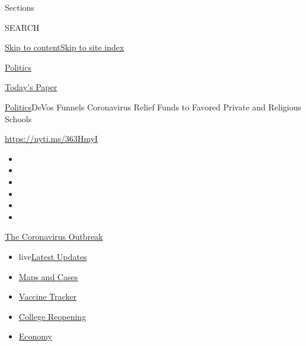 Sections

SEARCH

\protect\hyperlink{site-content}{Skip to
content}\protect\hyperlink{site-index}{Skip to site index}

\href{https://www.nytimes3xbfgragh.onion/section/politics}{Politics}

\href{https://myaccount.nytimes3xbfgragh.onion/auth/login?response_type=cookie\&client_id=vi}{}

\href{https://www.nytimes3xbfgragh.onion/section/todayspaper}{Today's
Paper}

\href{/section/politics}{Politics}\textbar{}DeVos Funnels Coronavirus
Relief Funds to Favored Private and Religious Schools

\url{https://nyti.ms/363HmyI}

\begin{itemize}
\item
\item
\item
\item
\item
\item
\end{itemize}

\href{https://www.nytimes3xbfgragh.onion/news-event/coronavirus?action=click\&pgtype=Article\&state=default\&region=TOP_BANNER\&context=storylines_menu}{The
Coronavirus Outbreak}

\begin{itemize}
\tightlist
\item
  live\href{https://www.nytimes3xbfgragh.onion/2020/08/04/world/coronavirus-cases.html?action=click\&pgtype=Article\&state=default\&region=TOP_BANNER\&context=storylines_menu}{Latest
  Updates}
\item
  \href{https://www.nytimes3xbfgragh.onion/interactive/2020/us/coronavirus-us-cases.html?action=click\&pgtype=Article\&state=default\&region=TOP_BANNER\&context=storylines_menu}{Maps
  and Cases}
\item
  \href{https://www.nytimes3xbfgragh.onion/interactive/2020/science/coronavirus-vaccine-tracker.html?action=click\&pgtype=Article\&state=default\&region=TOP_BANNER\&context=storylines_menu}{Vaccine
  Tracker}
\item
  \href{https://www.nytimes3xbfgragh.onion/2020/08/02/us/covid-college-reopening.html?action=click\&pgtype=Article\&state=default\&region=TOP_BANNER\&context=storylines_menu}{College
  Reopening}
\item
  \href{https://www.nytimes3xbfgragh.onion/live/2020/08/04/business/stock-market-today-coronavirus?action=click\&pgtype=Article\&state=default\&region=TOP_BANNER\&context=storylines_menu}{Economy}
\end{itemize}

